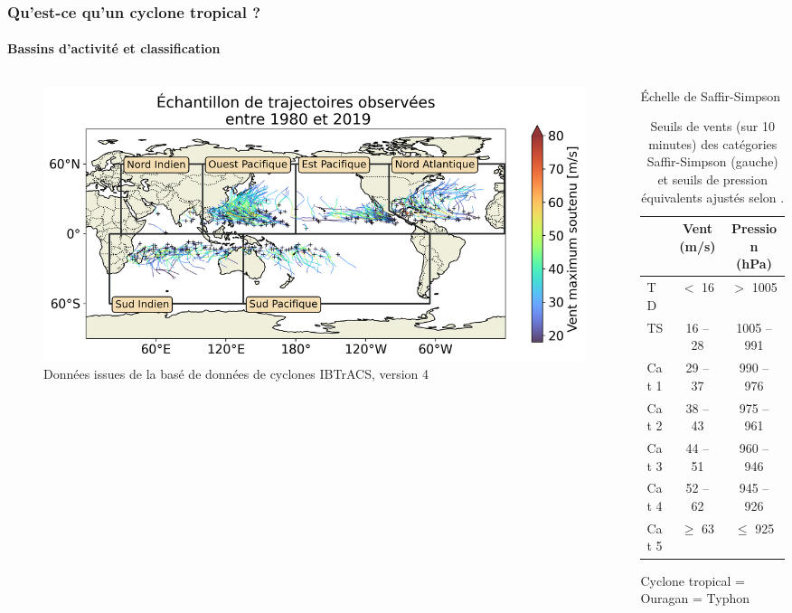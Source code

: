 \documentclass[aspectratio=169, usepdftitle=false, xcolor={dvipsnames}, 9pt,table]{beamer}
\begin{document}
\begin{frame}[c]
    \frametitle{Qu'est-ce qu'un cyclone tropical ?}
    \framesubtitle{Bassins d'activité et classification}
    \begin{columns}
        \begin{column}{0.65\textwidth}
            \begin{figure}[h]
                \centering
                \includegraphics[width=\textwidth]{Figures/Bassins_et_trajectoires_soutenance.png}
                \caption{\scriptsize Données issues de la basé de données de cyclones IBTrACS, version 4}
            \end{figure}
        \end{column}
        \begin{column}{0.35\textwidth}
            \vspace{-2em}
            \begin{table}
                \centering
                \footnotesize
                \caption{\centering \large Échelle de Saffir-Simpson}
                \begin{tabular}{l|c|c}
                     & Vent (m/s) & Pression (hPa) \\
                    \hline
                    TD & $<$ 16 & $>$ 1005 \\
                    TS & 16 -- 28 & 1005 -- 991 \\
                    Cat 1 & 29 -- 37 & 990 -- 976 \\
                    Cat 2 & 38 -- 43 & 975 -- 961 \\
                    Cat 3 & 44 -- 51 & 960 -- 946 \\
                    Cat 4 & 52 --  62 & 945 -- 926\\
                    Cat 5 & $\geq$ 63 & $\leq$ 925
                \end{tabular}
                \caption{\scriptsize Seuils de vents (sur 10 minutes) des catégories Saffir-Simpson (gauche) et seuils de pression équivalents ajustés
                selon \mbox{\cite{klotzbach_surface_2020}}.}
            \end{table}
            \begin{definition}
                \small Cyclone tropical = Ouragan = Typhon
            \end{definition}
        \end{column}
    \end{columns}
\end{frame}
\end{document}

